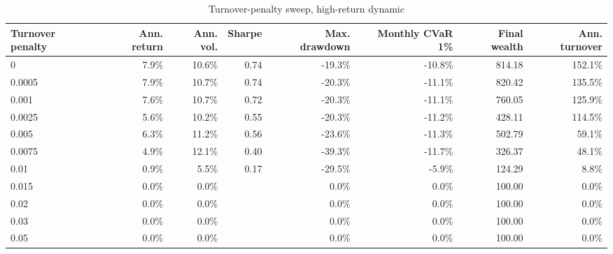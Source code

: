 ﻿\begin{table}[!htbp]
\centering
\caption{Turnover-penalty sweep, high-return dynamic}
\label{tab:allocation-turnover-penalty-high-return}
\small
\setlength{\tabcolsep}{5pt}
\renewcommand{\arraystretch}{1.12}
\begin{adjustbox}{center,max width=\linewidth}
\begin{tabular}{lrrrrrrr}
\toprule
Turnover penalty & Ann. return & Ann. vol. & Sharpe & Max. drawdown & Monthly CVaR 1\% & Final wealth & Ann. turnover \\
\midrule
0 & 7.9\% & 10.6\% & 0.74 & -19.3\% & -10.8\% & 814.18 & 152.1\% \\
0.0005 & 7.9\% & 10.7\% & 0.74 & -20.3\% & -11.1\% & 820.42 & 135.5\% \\
0.001 & 7.6\% & 10.7\% & 0.72 & -20.3\% & -11.1\% & 760.05 & 125.9\% \\
0.0025 & 5.6\% & 10.2\% & 0.55 & -20.3\% & -11.2\% & 428.11 & 114.5\% \\
0.005 & 6.3\% & 11.2\% & 0.56 & -23.6\% & -11.3\% & 502.79 & 59.1\% \\
0.0075 & 4.9\% & 12.1\% & 0.40 & -39.3\% & -11.7\% & 326.37 & 48.1\% \\
0.01 & 0.9\% & 5.5\% & 0.17 & -29.5\% & -5.9\% & 124.29 & 8.8\% \\
0.015 & 0.0\% & 0.0\% &  & 0.0\% & 0.0\% & 100.00 & 0.0\% \\
0.02 & 0.0\% & 0.0\% &  & 0.0\% & 0.0\% & 100.00 & 0.0\% \\
0.03 & 0.0\% & 0.0\% &  & 0.0\% & 0.0\% & 100.00 & 0.0\% \\
0.05 & 0.0\% & 0.0\% &  & 0.0\% & 0.0\% & 100.00 & 0.0\% \\
\bottomrule
\end{tabular}
\end{adjustbox}
\end{table}
